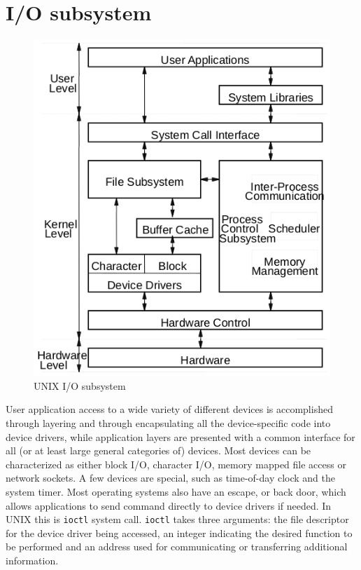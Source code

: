 \section{I/O subsystem}
\begin{figure}[hbtp]
\centering
\includegraphics[scale=0.4]{images/device_management/unix_io_subsystem.png}
\caption{UNIX I/O subsystem}
\end{figure}
User application access to a wide variety of different devices is accomplished through layering and through encapsulating all the device-specific code into device drivers, while application layers are presented with a common interface for all (or at least large general categories of) devices. Most devices can be characterized as either block I/O, character I/O, memory mapped file access or network sockets. A few devices are special, such as time-of-day clock and the system timer. Most operating systems also have an escape, or back door, which allows applications to send command directly to device drivers if needed. In UNIX this is \texttt{ioctl} system call. \texttt{ioctl} takes three arguments: the file descriptor for the device driver being accessed, an integer indicating the desired function to be performed and an address used for communicating or transferring additional information.


